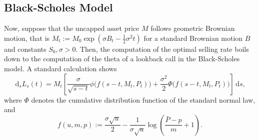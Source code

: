 \documentclass[11pt]{article}
\theoremstyle{definition}
\theoremstyle{remark}
\newcommand{\ts}{\textstyle}
\newcommand{\de}{\,\mathrm{d}}
\begin{document}
\subsection{Black-Scholes Model}
Now, suppose that the uncapped asset price $M$ follows geometric Brownian motion, that is $M_t:=M_0\exp\left(\sigma B_t-\frac{1}{2}\sigma^2 t\right)$ for a standard Brownian motion $B$ and constants $S_0, \sigma >0$. Then, the computation of the optimal selling rate boils down to the computation of the theta of a lookback call in the Black-Scholes model. A standard calculation shows
\[
\de_s L_s(t) = M_t\left[ \frac{\sigma}{\sqrt{s-t}}\phi\bigl(f(s-t,M_t,P_t)\bigr)+\frac{\sigma^2}{2}\Phi\bigl(f(s-t,M_t,P_t)\bigr)\right] \de s,
\]
where $\Phi$ denotes the cumulative distribution function of the standard normal law, and
\[
 f(u,m,p) := \frac{\sigma\sqrt{u}}{2} - \frac{1}{\sigma\sqrt{u}}\log\left(\frac{\bar{P}-p}{m}+1\right).
\]
\end{document}
